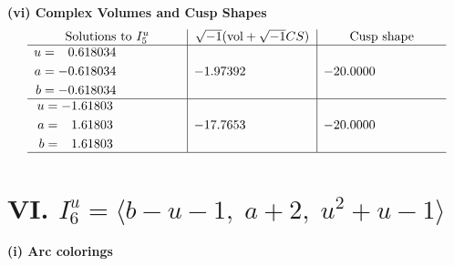 \documentclass[1p]{elsarticle_modified}
\theoremstyle{definition}
\newcommand{\I}{\sqrt{-1}}
\begin{document}
\newpage\flushleft \textbf{(vi) Complex Volumes and Cusp Shapes}
$$\begin{array}{c|c|c}  
\text{Solutions to }I^u_{5}& \I (\text{vol} + \sqrt{-1}CS) & \text{Cusp shape}\\
 \hline 
\begin{aligned}
u &= \phantom{-}0.618034\phantom{ +0.000000I} \\
a &= -0.618034\phantom{ +0.000000I} \\
b &= -0.618034\phantom{ +0.000000I}\end{aligned}
 & -1.97392\phantom{ +0.000000I} & -20.0000\phantom{ +0.000000I} \\ \hline\begin{aligned}
u &= -1.61803\phantom{ +0.000000I} \\
a &= \phantom{-}1.61803\phantom{ +0.000000I} \\
b &= \phantom{-}1.61803\phantom{ +0.000000I}\end{aligned}
 & -17.7653\phantom{ +0.000000I} & -20.0000\phantom{ +0.000000I}\\
 \hline 
 \end{array}$$\newpage\newpage\renewcommand{\arraystretch}{1}
\centering \section*{VI. $I^u_{6}= \langle b- u-1,\;a+2,\;u^2+u-1 \rangle$}
\flushleft \textbf{(i) Arc colorings}\\
\end{document}
